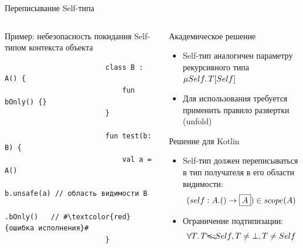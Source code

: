 \documentclass[usenames, dvipsnames]{beamer}
\begin{document}
\begin{frame}[fragile]{Переписывание Self-типа}
\begin{columns}[onlytextwidth]
\begin{column}[t]{0.485\textwidth}
\begin{block}{Пример: небезопасность покидания Self-типом контекста объекта}
\begin{verbatim}
                        class B : A() {
                            fun bOnly() {}
                        }

                        fun test(b: B) {
                            val a = A()
                            b.unsafe(a) // область видимости B
                             .bOnly()   // #\textcolor{red}{ошибка исполнения}#
                        }
                    \end{verbatim}
                \end{block}
            \end{column}\hfill%
            \begin{column}[t]{0.485\textwidth}
                \begin{block}{Академическое решение}
                    \begin{itemize}
                        \item Self-тип аналогичен параметру рекурсивного типа $\mu Self\ldotp T[Self]$
                        \item Для использования требуется применить правило развертки (unfold)
                    \end{itemize}
                \end{block}
                \begin{block}{Решение для Kotlin}
                    \begin{itemize}
                        \item Self-тип должен переписываться в тип получателя в его области видимости:
                        \[(self : A.() \to \framebox{$A$}) \in scope(A)\]
                        \item Ограничение подтипизации: \[\forall T \ldotp T \bcancel{<:} Self, T \neq \bot, T \neq Self\]
                    \end{itemize}
                    \vspace{0.23em}
                \end{block}
            \end{column}
        \end{columns}
    \end{frame}
\end{document}
